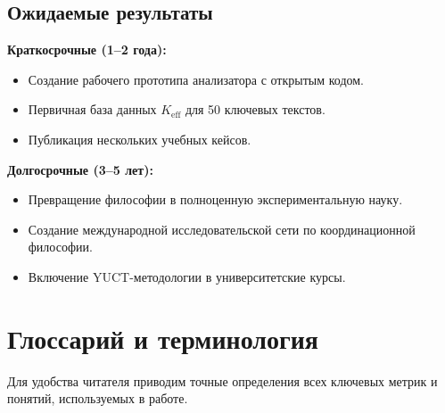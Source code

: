 \documentclass[12pt,a4paper]{article}
\begin{document}
	\subsection{Ожидаемые результаты}
	
	\textbf{Краткосрочные (1–2 года):}
	\begin{itemize}
		\item Создание рабочего прототипа анализатора с открытым кодом.
		\item Первичная база данных \(K_{\mathrm{eff}}\) для 50 ключевых текстов.
		\item Публикация нескольких учебных кейсов.
	\end{itemize}
	
	\textbf{Долгосрочные (3–5 лет):}
	\begin{itemize}
		\item Превращение философии в полноценную экспериментальную науку.
		\item Создание международной исследовательской сети по координационной философии.
		\item Включение YUCT-методологии в университетские курсы.
	\end{itemize}
	
	\section{Глоссарий и терминология}
	\label{sec:glossary}
	
	Для удобства читателя приводим точные определения всех ключевых метрик и понятий, используемых в работе.
	
\end{document}
